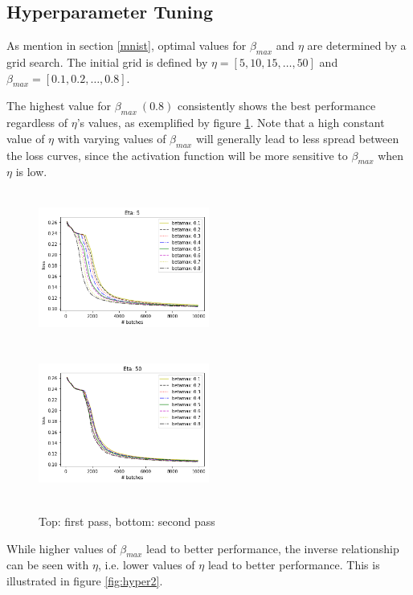 \documentclass{article}
\begin{document}
\subsection{Hyperparameter Tuning} 
As mention in section \ref{mnist}, optimal values for $\beta_{max}$ and $\eta$ are determined by a grid search. The initial grid is defined by $\eta = [5, 10, 15, \dots, 50]$ and $\beta_{max} = [0.1, 0.2, \dots, 0.8]$. 

The highest value for $\beta_{max} \ (0.8)$ consistently shows the best performance regardless of $\eta$'s values, as exemplified by figure \ref{fig:hyper1}. Note that a high constant value of $\eta$ with varying values of $\beta_{max}$ will generally lead to less spread between the loss curves, since the activation function will be more sensitive to $\beta_{max}$ when $\eta$ is low. 

\begin{figure}[H]
      \centering
      \includegraphics[width=0.5\textwidth,height=5cm,keepaspectratio]{img/appendix/hyper/eta5.png}
      \includegraphics[width=0.5\textwidth,height=5cm,keepaspectratio]{img/appendix/hyper/eta50.png}
      \caption{Top: first pass, bottom: second pass}
      \label{fig:hyper1}
  \end{figure}

While higher values of $\beta_{max}$ lead to better performance, the inverse relationship can be seen with $\eta$, i.e. lower values of $\eta$ lead to better performance. This is illustrated in figure \ref{fig:hyper2}.  
\end{document}

